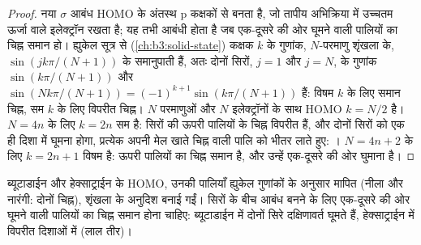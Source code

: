 \begin{proof}
नया $\sigma$ आबंध HOMO के अंतस्थ p कक्षकों से बनता है, जो
तापीय अभिक्रिया में उच्चतम ऊर्जा वाले इलेक्ट्रॉन रखता है; यह तभी आबंधी होता है जब
एक-दूसरे की ओर घूमने वाली पालियों का चिह्न समान हो। ह्युकेल सूत्र से
(\cref{ch:b3:solid-state}) कक्षक $k$ के गुणांक, $N$-परमाणु शृंखला के,
$\sin(jk\pi/(N + 1))$ के समानुपाती हैं, अतः दोनों सिरों, $j = 1$ और $j = N$, के
गुणांक $\sin(k\pi/(N + 1))$ और $\sin(Nk\pi/(N + 1)) = (-1)^{k+1}\sin(k\pi/(N + 1))$ हैं: विषम $k$ के लिए समान चिह्न,
सम $k$ के लिए विपरीत चिह्न। $N$ परमाणुओं और $N$ इलेक्ट्रॉनों के साथ HOMO
$k = N/2$ है। $N = 4n$ के लिए $k = 2n$ सम है: सिरों की ऊपरी पालियों के चिह्न
विपरीत हैं, और दोनों सिरों को एक ही दिशा में घूमना होगा, प्रत्येक अपनी
मेल खाते चिह्न वाली पालि को भीतर लाते हुए: । $N = 4n + 2$ के लिए $k = 2n + 1$ विषम है: ऊपरी पालियों
का चिह्न समान है, और उन्हें एक-दूसरे की ओर घुमाना  है।
\end{proof}

\begin{omfigure}

{\small ब्यूटाडाईन और हेक्साट्राईन के HOMO, उनकी पालियाँ
ह्युकेल गुणांकों के अनुसार मापित (नीला और नारंगी: दोनों चिह्न), शृंखला के अनुदिश बनाई गईं।
सिरों के बीच आबंध बनने के लिए एक-दूसरे की ओर घूमने वाली पालियों का
चिह्न समान होना चाहिए: ब्यूटाडाईन में दोनों सिरे दक्षिणावर्त घूमते हैं, हेक्साट्राईन में विपरीत
दिशाओं में (लाल तीर)।}
\end{omfigure}

